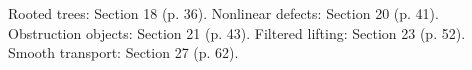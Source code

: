 {\small Rooted trees: Section 18 (p. 36). Nonlinear defects: Section 20 (p. 41). Obstruction objects: Section 21 (p. 43). Filtered lifting: Section 23 (p. 52). Smooth transport: Section 27 (p. 62).\par}
